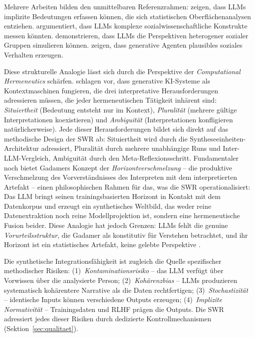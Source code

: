 \documentclass[11pt,a4paper]{article}
\theoremstyle{definition}
\theoremstyle{plain}
\theoremstyle{remark}
\begin{document}
Mehrere Arbeiten bilden den unmittelbaren Referenzrahmen: \citet{Ziems2024} zeigen, dass LLMs implizite Bedeutungen erfassen k\"onnen, die sich statistischen Oberfl\"achenanalysen entziehen. \citet{Bail2024} argumentiert, dass LLMs komplexe sozialwissenschaftliche Konstrukte messen k\"onnten. \citet{Argyle2023} demonstrieren, dass LLMs die Perspektiven heterogener sozialer Gruppen simulieren k\"onnen. \citet{Park2023} zeigen, dass generative Agenten plausibles soziales Verhalten erzeugen.

Diese strukturelle Analogie l\"asst sich durch die Perspektive der \emph{Computational Hermeneutics} sch\"arfen. \citet{Ramberg2026} schlagen vor, dass generative KI-Systeme als \glqq Kontextmaschinen\grqq{} fungieren, die drei interpretative Herausforderungen adressieren m\"ussen, die jeder hermeneutischen T\"atigkeit inh\"arent sind: \emph{Situiertheit} (Bedeutung entsteht nur im Kontext), \emph{Pluralit\"at} (mehrere g\"ultige Interpretationen koexistieren) und \emph{Ambiguit\"at} (Interpretationen konfligieren nat\"urlicherweise). Jede dieser Herausforderungen bildet sich direkt auf das methodische Design der SWR ab: Situiertheit wird durch die Syntheseeinheiten-Architektur adressiert, Pluralit\"at durch mehrere unabh\"angige Runs und Inter-LLM-Vergleich, Ambiguit\"at durch den Meta-Reflexionsschritt. Fundamentaler noch bietet Gadamers Konzept der \emph{Horizontverschmelzung} \citep{Gadamer1960} -- die produktive Verschmelzung des Vorverst\"andnisses des Interpreten mit dem interpretierten Artefakt -- einen philosophischen Rahmen f\"ur das, was die SWR operationalisiert: Das LLM bringt seinen trainingsbasierten \glqq Horizont\grqq{} in Kontakt mit dem Datenkorpus und erzeugt ein synthetisches Weltbild, das weder reine Datenextraktion noch reine Modellprojektion ist, sondern eine hermeneutische Fusion beider. Diese Analogie hat jedoch Grenzen: LLMs fehlt die genuine \emph{Vorurteilsstruktur}, die Gadamer als konstitutiv f\"ur Verstehen betrachtet, und ihr \glqq Horizont\grqq{} ist ein statistisches Artefakt, keine gelebte Perspektive \citep{Hornby2024}.

Die synthetische Integrationsf\"ahigkeit ist zugleich die Quelle spezifischer methodischer Risiken: (1)~\emph{Kontaminationsrisiko} -- das LLM verf\"ugt \"uber Vorwissen \"uber die analysierte Person; (2)~\emph{Koh\"arenzbias} -- LLMs produzieren systematisch koh\"arentere Narrative als die Daten rechtfertigen; (3)~\emph{Stochastizit\"at} -- identische Inputs k\"onnen verschiedene Outputs erzeugen; (4)~\emph{Implizite Normativit\"at} -- Trainingsdaten und RLHF pr\"agen die Outputs. Die SWR adressiert jedes dieser Risiken durch dedizierte Kontrollmechanismen (Sektion~\ref{sec:qualitaet}).
\end{document}
